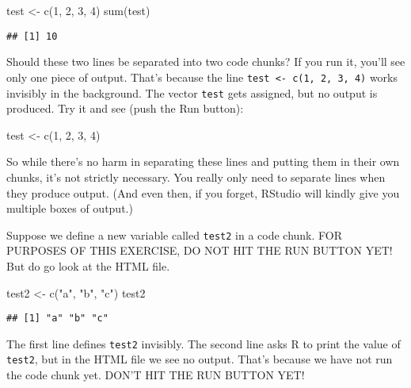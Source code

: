 \documentclass[
]{book}
\newenvironment{Shaded}{\begin{snugshade}}{\end{snugshade}}
\newcommand{\DecValTok}[1]{\textcolor[rgb]{0.00,0.00,0.81}{#1}}
\newcommand{\FunctionTok}[1]{\textcolor[rgb]{0.00,0.00,0.00}{#1}}
\newcommand{\NormalTok}[1]{#1}
\newcommand{\OtherTok}[1]{\textcolor[rgb]{0.56,0.35,0.01}{#1}}
\newcommand{\StringTok}[1]{\textcolor[rgb]{0.31,0.60,0.02}{#1}}
\begin{document}
\begin{Shaded}
\begin{Highlighting}[]
\NormalTok{test }\OtherTok{\textless{}{-}} \FunctionTok{c}\NormalTok{(}\DecValTok{1}\NormalTok{, }\DecValTok{2}\NormalTok{, }\DecValTok{3}\NormalTok{, }\DecValTok{4}\NormalTok{)}
\FunctionTok{sum}\NormalTok{(test)}
\end{Highlighting}
\end{Shaded}

\begin{verbatim}
## [1] 10
\end{verbatim}

Should these two lines be separated into two code chunks? If you run it, you'll see only one piece of output. That's because the line \texttt{test\ \textless{}-\ c(1,\ 2,\ 3,\ 4)} works invisibly in the background. The vector \texttt{test} gets assigned, but no output is produced. Try it and see (push the Run button):

\begin{Shaded}
\begin{Highlighting}[]
\NormalTok{test }\OtherTok{\textless{}{-}} \FunctionTok{c}\NormalTok{(}\DecValTok{1}\NormalTok{, }\DecValTok{2}\NormalTok{, }\DecValTok{3}\NormalTok{, }\DecValTok{4}\NormalTok{)}
\end{Highlighting}
\end{Shaded}

So while there's no harm in separating these lines and putting them in their own chunks, it's not strictly necessary. You really only need to separate lines when they produce output. (And even then, if you forget, RStudio will kindly give you multiple boxes of output.)

Suppose we define a new variable called \texttt{test2} in a code chunk. FOR PURPOSES OF THIS EXERCISE, DO NOT HIT THE RUN BUTTON YET! But do go look at the HTML file.

\begin{Shaded}
\begin{Highlighting}[]
\NormalTok{test2 }\OtherTok{\textless{}{-}} \FunctionTok{c}\NormalTok{(}\StringTok{"a"}\NormalTok{, }\StringTok{"b"}\NormalTok{, }\StringTok{"c"}\NormalTok{)}
\NormalTok{test2}
\end{Highlighting}
\end{Shaded}

\begin{verbatim}
## [1] "a" "b" "c"
\end{verbatim}

The first line defines \texttt{test2} invisibly. The second line asks R to print the value of \texttt{test2}, but in the HTML file we see no output. That's because we have not run the code chunk yet. DON'T HIT THE RUN BUTTON YET!
\end{document}
